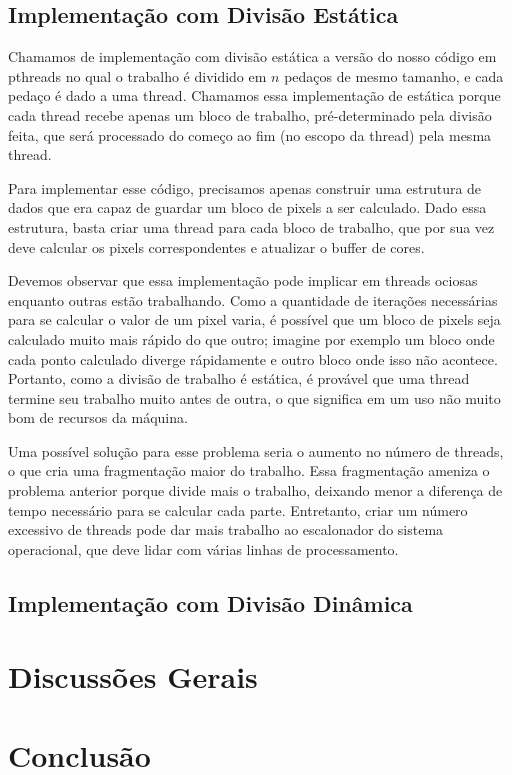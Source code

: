 \documentclass[12pt]{article}
\begin{document}
\subsection{Implementação com Divisão Estática}
Chamamos de implementação com divisão estática a versão do nosso 
código em pthreads no qual o trabalho é dividido em $n$ pedaços de mesmo 
tamanho, e cada pedaço é dado a uma thread. Chamamos essa implementação
de estática porque cada thread recebe apenas um bloco de trabalho,
pré-determinado pela divisão feita, que será processado do começo ao
fim (no escopo da thread) pela mesma thread.

Para implementar esse código, precisamos apenas construir uma estrutura
de dados que era capaz de guardar um bloco de pixels a ser calculado.
Dado essa estrutura, basta criar uma thread para cada bloco de trabalho,
que por sua vez deve calcular os pixels correspondentes e atualizar o 
buffer de cores.

Devemos observar que essa implementação pode implicar em threads ociosas
enquanto outras estão trabalhando. Como a quantidade de iterações
necessárias para se calcular o valor de um pixel varia, é possível que
um bloco de pixels seja calculado muito mais rápido do que outro; 
imagine por exemplo um bloco onde cada ponto calculado diverge 
rápidamente e outro bloco onde isso não acontece. Portanto, como a 
divisão de trabalho é estática, é provável que uma thread termine seu
trabalho muito antes de outra, o que significa em um uso não muito bom
de recursos da máquina.

Uma possível solução para esse problema seria o aumento no número de 
threads, o que cria uma fragmentação maior do trabalho. Essa 
fragmentação ameniza o problema anterior porque divide mais o trabalho,
deixando menor a diferença de tempo necessário para se calcular cada 
parte. Entretanto, criar um número excessivo de threads pode dar mais
trabalho ao escalonador do sistema operacional, que deve lidar com 
várias linhas de processamento.

\subsection{Implementação com Divisão Dinâmica}

\section{Discussões Gerais}
\section{Conclusão}
\end{document}
